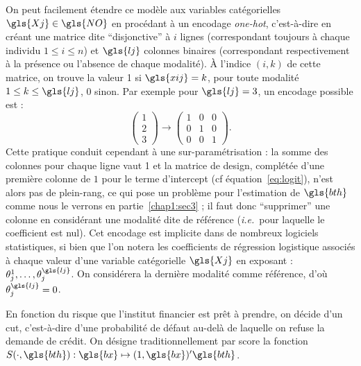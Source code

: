 On peut facilement étendre ce modèle aux variables catégorielles $\gls{Xj} \in \gls{NO}$ en procédant à un encodage \textit{one-hot}, c'est-à-dire en créant une matrice dite ``disjonctive'' à $i$ lignes (correspondant toujours à chaque individu $1 \leq i \leq n$) et $\gls{lj}$ colonnes binaires (correspondant respectivement à la présence ou l'absence de chaque modalité). \`A l'indice $(i,k)$ de cette matrice, on trouve la valeur 1 si $\gls{xij} = k$, pour toute modalité $1 \leq k \leq \gls{lj}$, 0 sinon. Par exemple pour $\gls{lj}=3$, un encodage possible est :
$$ \left( \begin{array}{c} 1 \\ 2 \\ 3 \end{array} \right) \to \left( \begin{array}{ccc} 1 & 0 & 0 \\ 0 & 1 & 0 \\ 0 & 0 & 1 \end{array} \right).$$
Cette pratique conduit cependant à une sur-paramétrisation : la somme des colonnes pour chaque ligne vaut 1 et la matrice de design, complétée d'une première colonne de $1$ pour le terme d'intercept (cf équation~\eqref{eq:logit}), n'est alors pas de plein-rang, ce qui pose un problème pour l'estimation de $\gls{bth}$ comme nous le verrons en partie~\ref{chap1:sec3} ; il faut donc ``supprimer'' une colonne en considérant une modalité dite de référence (\textit{i.e.}\ pour laquelle le coefficient est nul). Cet encodage est implicite dans de nombreux logiciels statistiques, si bien que l'on notera les coefficients de régression logistique associés à chaque valeur d'une variable catégorielle $\gls{Xj}$ en exposant : $\theta_j^{1},\dots,\theta_j^{\gls{lj}}$. On considérera la dernière modalité comme référence, d'où $\theta_j^{\gls{lj}} = 0$.

En fonction du risque que l'institut financier est prêt à prendre, on décide d'un \gls{cut}, c'est-à-dire d'une probabilité de défaut au-delà de laquelle on refuse la demande de crédit. On désigne traditionnellement par \gls{score} la fonction $S(\cdot,\gls{bth}): \gls{bx} \mapsto (1,\gls{bx})' \gls{bth}$.

